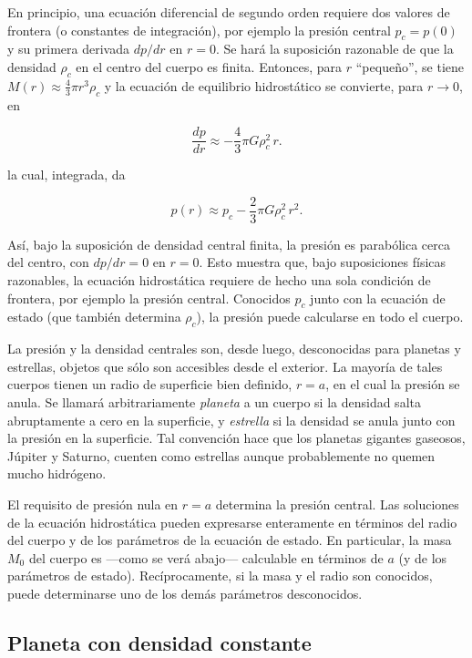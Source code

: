 En principio, una ecuación diferencial de segundo orden requiere dos valores de frontera (o constantes de integración), por ejemplo la presión central $p_c = p(0)$ y su primera derivada $dp/dr$ en $r = 0$. Se hará la suposición razonable de que la densidad $\rho_c$ en el centro del cuerpo es finita. Entonces, para $r$ ``pequeño'', se tiene $M(r) \approx \frac{4}{3}\pi r^3 \rho_c$ y la ecuación de equilibrio hidrostático se convierte, para $r \to 0$, en

$$ \frac{dp}{dr} \approx -\frac{4}{3}\pi G \rho_c^2\, r. $$

la cual, integrada, da

$$ p(r) \approx p_c - \frac{2}{3}\pi G \rho_c^2\, r^2. $$

Así, bajo la suposición de densidad central finita, la presión es parabólica cerca del centro, con $dp/dr = 0$ en $r = 0$. Esto muestra que, bajo suposiciones físicas razonables, la ecuación hidrostática requiere de hecho una sola condición de frontera, por ejemplo la presión central. Conocidos $p_c$ junto con la ecuación de estado (que también determina $\rho_c$), la presión puede calcularse en todo el cuerpo.

La presión y la densidad centrales son, desde luego, desconocidas para planetas y estrellas, objetos que sólo son accesibles desde el exterior. La mayoría de tales cuerpos tienen un radio de superficie bien definido, $r = a$, en el cual la presión se anula. Se llamará arbitrariamente \emph{planeta} a un cuerpo si la densidad salta abruptamente a cero en la superficie, y \emph{estrella} si la densidad se anula junto con la presión en la superficie. Tal convención hace que los planetas gigantes gaseosos, Júpiter y Saturno, cuenten como estrellas aunque probablemente no quemen mucho hidrógeno.

El requisito de presión nula en $r = a$ determina la presión central. Las soluciones de la ecuación hidrostática pueden expresarse enteramente en términos del radio del cuerpo y de los parámetros de la ecuación de estado. En particular, la masa $M_0$ del cuerpo es —como se verá abajo— calculable en términos de $a$ (y de los parámetros de estado). Recíprocamente, si la masa y el radio son conocidos, puede determinarse uno de los demás parámetros desconocidos.

\subsection{Planeta con densidad constante}

